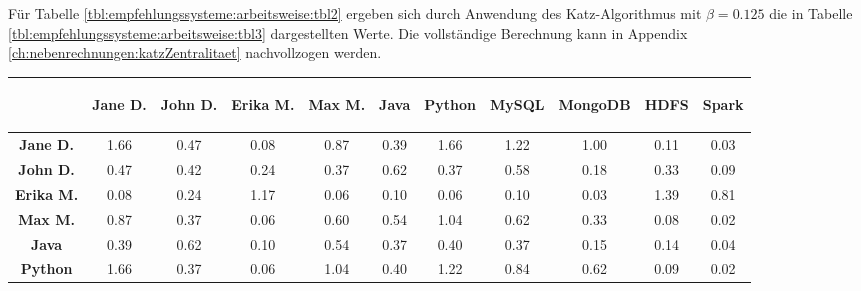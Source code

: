 Für Tabelle \ref{tbl:empfehlungssysteme:arbeitsweise:tbl2} ergeben sich durch Anwendung des Katz-Algorithmus mit $\beta = 0.125$ die in Tabelle \ref{tbl:empfehlungssysteme:arbeitsweise:tbl3} dargestellten Werte. Die vollständige Berechnung kann in Appendix \ref{ch:nebenrechnungen:katzZentralitaet} nachvollzogen werden.

\begin{table}[h]
	\centering
	\begin{tabular}{c|c|c|c|c|c|c|c|c|c|c}
		& \begin{sideways}\textbf{Jane D.}\end{sideways} & \begin{sideways}\textbf{John D.}\end{sideways} & \begin{sideways}\textbf{Erika M.}\end{sideways} & \begin{sideways}\textbf{Max M.}\end{sideways} & \begin{sideways}\textbf{Java}\end{sideways} & \begin{sideways}\textbf{Python}\end{sideways} & \begin{sideways}\textbf{MySQL}\end{sideways} & \begin{sideways}\textbf{MongoDB}\end{sideways} & \begin{sideways}\textbf{HDFS}\end{sideways} & \begin{sideways}\textbf{Spark}\end{sideways} \\ 
		\hline
		\textbf{Jane D.}  & 1.66 & 0.47 & 0.08 & 0.87 & 0.39 & 1.66 & 1.22 & 1.00 & 0.11 & 0.03\\
		\textbf{John D.}  & 0.47 & 0.42 & 0.24 & 0.37 & 0.62 & 0.37 & 0.58 & 0.18 & 0.33 & 0.09\\
		\textbf{Erika M.} & 0.08 & 0.24 & 1.17 & 0.06 & 0.10 & 0.06 & 0.10 & 0.03 & 1.39 & 0.81\\
		\textbf{Max M.}   & 0.87 & 0.37 & 0.06 & 0.60 & 0.54 & 1.04 & 0.62 & 0.33 & 0.08 & 0.02\\
		\textbf{Java}     & 0.39 & 0.62 & 0.10 & 0.54 & 0.37 & 0.40 & 0.37 & 0.15 & 0.14 & 0.04\\
		\textbf{Python}   & 1.66 & 0.37 & 0.06 & 1.04 & 0.40 & 1.22 & 0.84 & 0.62 & 0.09 & 0.02\\

\end{tabular}
\end{table}
